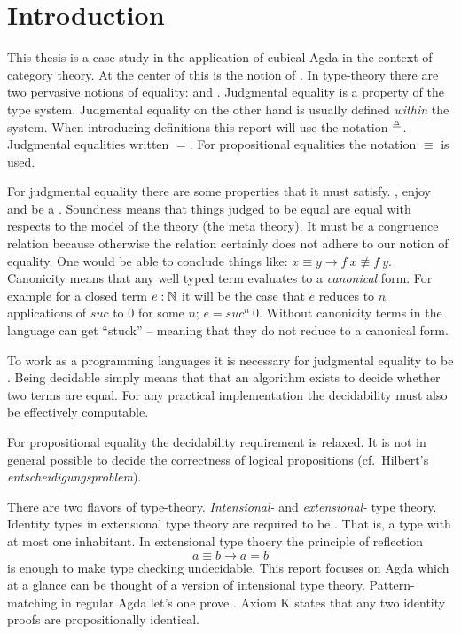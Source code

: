 \chapter{Introduction}
This thesis is a case-study in the application of cubical Agda in the
context of category theory. At the center of this is the notion of
. In type-theory there are two pervasive notions
of equality:  and
. Judgmental equality is a property
of the type system. Judgmental equality on the other hand is usually
defined \emph{within} the system. When introducing definitions this
report will use the notation $\mathrel{\triangleq}$. Judgmental equalities written
$=$. For propositional equalities the notation $\equiv$ is used.

For judgmental equality there are some properties that it must
satisfy. , enjoy  and be a
. Soundness means that things judged to be
equal are equal with respects to the model of the theory (the meta
theory). It must be a congruence relation because otherwise the
relation certainly does not adhere to our notion of equality. One
would be able to conclude things like: $x \equiv y \rightarrow f\ x
\nequiv f\ y$. Canonicity means that any well typed term evaluates to
a \emph{canonical} form. For example for a closed term $e \mathrel{:} \mathbb{N}$ it
will be the case that $e$ reduces to $n$ applications of
$\mathit{suc}$ to $0$ for some $n$; $e = \mathit{suc}^n\ 0$. Without
canonicity terms in the language can get ``stuck'' -- meaning that
they do not reduce to a canonical form.

To work as a programming languages it is necessary for judgmental
equality to be . Being decidable simply means
that that an algorithm exists to decide whether two terms are equal.
For any practical implementation the decidability must also be
effectively computable.

For propositional equality the decidability requirement is relaxed. It
is not in general possible to decide the correctness of logical
propositions (cf.\ Hilbert's \emph{entscheidigungsproblem}).

There are two flavors of type-theory. \emph{Intensional-} and
\emph{extensional-} type theory. Identity types in extensional type
theory are required to be . That is,
a type with at most one inhabitant. In extensional type thoery the
principle of reflection
%
$$a ≡ b → a = b$$
%
is enough to make type checking undecidable. This report focuses on
Agda which at a glance can be thought of a version of intensional type
theory. Pattern-matching in regular Agda let's one prove
. Axiom K states that any two identity proofs are
propositionally identical.

